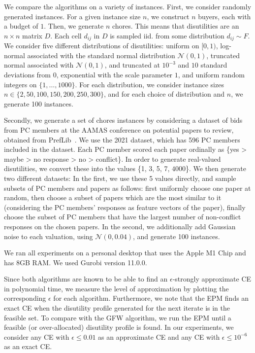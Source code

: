 \documentclass[format=acmsmall,authorversion]{acmart}
\begin{document}
We compare the algorithms on a variety of instances. First, we consider 
randomly generated instances. For a given instance size $n$, we construct $n$ buyers, each with a budget of $1$.
Then, we generate $n$ chores. This means that disutilities are an $n\times n$ matrix $D$. Each cell $d_{ij}$ in $D$ is sampled iid. from some distribution $d_{ij} \sim F$.
We consider five different distributions of disutilities:
uniform on $[0,1)$,
log-normal associated with the standard normal distribution $\mathcal{N}(0, 1)$,
truncated normal associated with $\mathcal{N}(0, 1)$, and truncated at ${10}^{-3}$ and $10$ standard deviations from $0$,
exponential with the scale parameter $1$, 
and uniform random integers on $\{1,\ldots,1000\}$.
For each distribution, we consider instance sizes $n\in \{2,50,100,150,200,250,300\}$, and for each choice of distribution and $n$, we generate 100 instances.

Secondly, we generate a set of chores instances by considering a dataset of bids from PC members at the AAMAS conference on potential papers to review, obtained from PrefLib~\citep{mattei2013preflib}. We use the 2021 dataset, which has 596 PC members included in the dataset.
Each PC member scored each paper ordinally as \{yes > maybe > no response > no > conflict\}.
In order to generate real-valued disutilities, we convert these into the values \{1, 3, 5, 7, $4000$\}.
We then generate two different datasets:
In the first, we use these 5 values directly, and sample subsets of PC members and papers as follows: first uniformly choose one paper at random, then choose a subset of papers which are the most similar to it (considering the PC members' responses as feature vectors of the paper), finally choose the subset of PC members that have the largest number of non-conflict responses on the chosen papers. 
In the second, we additionally add Gaussian noise to each valuation, using $\mathcal{N}(0, 0.04)$, and generate 100 instances.



We ran all experiments on a personal desktop that uses the Apple M1 Chip and has 8GB RAM. 
We used Gurobi version 11.0.0. 



Since both algorithms are known to be able to find an $\epsilon$-strongly approximate CE in polynomial time, we measure the level of approximation by plotting the corresponding $\epsilon$ for each algorithm. 
Furthermore, we note that the EPM finds an exact CE when the disutility profile generated for the next iterate is in the feasible set. To compare with the GFW algorithm, we run the EPM until a feasible (or over-allocated) disutility profile is found. 
In our experiments, we consider any CE with $\epsilon\leq0.01$ as an approximate CE and any CE with $\epsilon\leq 10^{-6}$ as an exact CE. 
\end{document}
